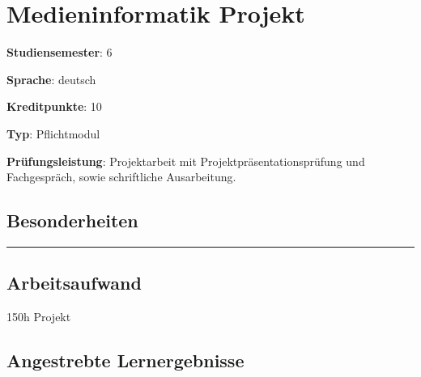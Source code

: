 \hypertarget{medieninformatik-projektpathlabel....srcmodulbeschreibungen-bachelor-bpo5ba_projekt}{%
\chapter{Medieninformatik
Projekt\label{../../src/modulbeschreibungen-bachelor-bpo5/BA_Projekt}}\label{medieninformatik-projektpathlabel....srcmodulbeschreibungen-bachelor-bpo5ba_projekt}}

\begin{modulHead}
\textbf{Studiensemester}:
6
\end{modulHead}
\begin{modulHead}
\textbf{Sprache}:
deutsch
\end{modulHead}
\begin{modulHead}
\textbf{Kreditpunkte}:
10
\end{modulHead}
\begin{modulHead}
\textbf{Typ}:
Pflichtmodul
\end{modulHead}
\begin{modulHead}
\textbf{Prüfungsleistung}:
Projektarbeit mit Projektpräsentationsprüfung und Fachgespräch, sowie
schriftliche Ausarbeitung.
\end{modulHead}


\hypertarget{besonderheitenpathlabel....srcmodulbeschreibungen-bachelor-bpo5ba_projekt}{%
\section*{Besonderheiten\label{../../src/modulbeschreibungen-bachelor-bpo5/BA_Projekt}}\label{besonderheitenpathlabel....srcmodulbeschreibungen-bachelor-bpo5ba_projekt}}

\begin{center}\rule{0.5\linewidth}{0.5pt}\end{center}

\hypertarget{arbeitsaufwandpathlabel....srcmodulbeschreibungen-bachelor-bpo5ba_projekt}{%
\section*{Arbeitsaufwand\label{../../src/modulbeschreibungen-bachelor-bpo5/BA_Projekt}}\label{arbeitsaufwandpathlabel....srcmodulbeschreibungen-bachelor-bpo5ba_projekt}}

150h Projekt

\hypertarget{angestrebte-lernergebnissepathlabel....srcmodulbeschreibungen-bachelor-bpo5ba_projekt}{%
\section*{Angestrebte
Lernergebnisse\label{../../src/modulbeschreibungen-bachelor-bpo5/BA_Projekt}}\label{angestrebte-lernergebnissepathlabel....srcmodulbeschreibungen-bachelor-bpo5ba_projekt}}

